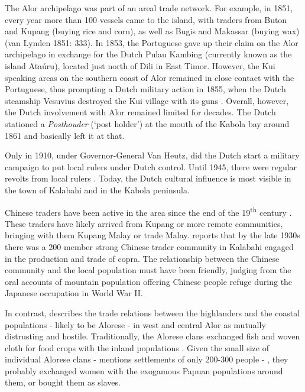 The Alor archipelago was part of an areal trade network. For example, in 1851, every year more than 100 vessels came to the island, with traders from Buton and Kupang (buying rice and corn), as well as Bugis and Makassar (buying wax) (van Lynden 1851: 333). In 1853, the Portuguese gave up their claim on the Alor archipelago in exchange for the Dutch Pulau Kambing (currently known as the island Ata\'uru), located just north of Dili in East Timor. However, the Kui speaking areas on the southern coast of Alor remained in close contact with the Portuguese, thus prompting a Dutch military action in 1855, when the Dutch steamship Vesuvius destroyed the Kui village with its guns \citep[18019]{Hagerdal2010galens1}. Overall, however, the Dutch involvement with Alor remained limited for decades. The Dutch stationed a \textit{Posthouder} (`post holder') at the mouth of the Kabola bay around 1861 and basically left it at that.

Only in 1910, under Governor-General Van Heutz, did the Dutch start a military campaign to put local rulers under Dutch control. Until 1945, there were regular revolts from local rulers \citep[see the reports in][2-9]{VanGaalen1945}. Today, the Dutch cultural influence is most visible in the town of Kalabahi and in the Kabola peninsula.

Chinese traders have been active in the area since the end of the 19\textsuperscript{th} century \citep[16]{DuBois1960}. These traders have likely arrived from Kupang or more remote communities, bringing with them Kupang Malay or trade Malay. \citet[1]{Nicolspeyer1940} reports that by the late 1930s there was a 200 member strong Chinese trader community in Kalabahi engaged in the production and trade of copra. The relationship between the Chinese community and the local population must have been friendly, judging from the oral accounts of mountain population offering Chinese people refuge during the Japanese occupation in World War II. 

In contrast, \citet[8]{Nicolspeyer1940} describes the trade relations between the highlanders and the coastal populations - likely to be Alorese - in west and central Alor as mutually distrusting and hostile. Traditionally, the Alorese clans exchanged fish and woven cloth for food crops with the inland populations \citep[cf.][76,81-82]{Anonymous1914}. Given the small size of individual Alorese clans - \citet[89-90]{Anonymous1914} mentions settlements of only 200-300 people - , they probably exchanged women with the exogamous Papuan populations around them, or bought them as slaves.

